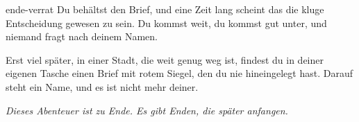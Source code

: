 \begin{soloBlock}{ende-verrat}
Du behältst den Brief, und eine Zeit lang scheint das die kluge Entscheidung gewesen
zu sein. Du kommst weit, du kommst gut unter, und niemand fragt nach deinem Namen.

Erst viel später, in einer Stadt, die weit genug weg ist, findest du in deiner
eigenen Tasche einen Brief mit rotem Siegel, den du nie hineingelegt hast. Darauf
steht ein Name, und es ist nicht mehr deiner.

\emph{Dieses Abenteuer ist zu Ende. Es gibt Enden, die später anfangen.}
\soloEnde
\end{soloBlock}
